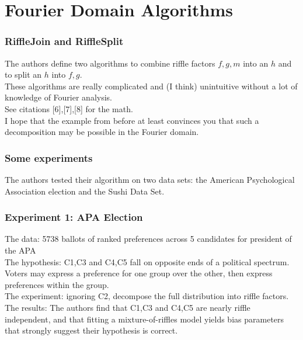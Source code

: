 \documentclass{beamer} %
\theoremstyle{definition} %
\def \pausenl {\pause $ \ $\\}
\begin{document}
\section{Fourier Domain Algorithms}
\begin{frame}
\frametitle{RiffleJoin and RiffleSplit}

The authors define two algorithms to combine riffle factors $f,g,m$ into an $h$ and to split an $h$ into $f,g$.\\

\pausenl

These algorithms are really complicated and (I think) unintuitive without a lot of knowledge of Fourier analysis.\\

See citations [6],[7],[8] for the math.\\

\pausenl

I hope that the example from before at least convinces you that such a decomposition may be possible in the Fourier domain.

\end{frame}

\begin{frame}
	\frametitle{Some experiments}
	
	The authors tested their algorithm on two data sets: the American Psychological Association election and the Sushi Data Set.
\end{frame}

\begin{frame}
	\frametitle{Experiment 1: APA Election}
	
	The data:  5738 ballots of ranked preferences across 5 candidates for president of the APA\\
	\pause
	The hypothesis: {C1,C3} and {C4,C5} fall on opposite ends of a political spectrum.  Voters may express a preference for one group over the other, then express preferences within the group.\\\pause
	The experiment: ignoring C2, decompose the full distribution into riffle factors.\\
	\pausenl
	
	The results:  The authors find that {C1,C3} and {C4,C5} are nearly riffle independent, and that fitting a mixture-of-riffles model yields bias parameters that strongly suggest their hypothesis is correct. 
	
\end{frame}
\end{document}
